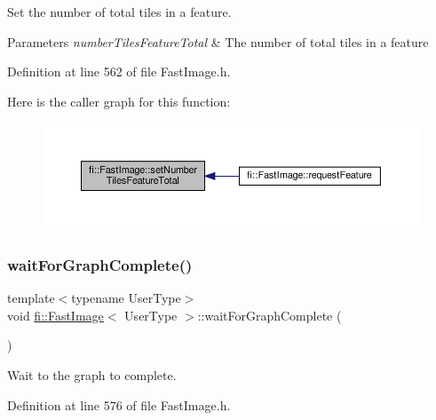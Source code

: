Set the number of total tiles in a feature. 


\begin{DoxyParams}{Parameters}
{\em number\+Tiles\+Feature\+Total} & The number of total tiles in a feature \\
\hline
\end{DoxyParams}


Definition at line 562 of file Fast\+Image.\+h.

Here is the caller graph for this function\+:
\nopagebreak
\begin{figure}[H]
\begin{center}
\leavevmode
\includegraphics[width=350pt]{dc/d6b/classfi_1_1FastImage_a7313f9c3bddf643dfab8cf026527651a_icgraph}
\end{center}
\end{figure}
\mbox{\label{classfi_1_1FastImage_aac69be21b7a131eade5b1ea79dbee59d}} 
\subsubsection{\texorpdfstring{wait\+For\+Graph\+Complete()}{waitForGraphComplete()}}
{\footnotesize\ttfamily template$<$typename User\+Type$>$ \\
void \hyperlink{classfi_1_1FastImage}{fi\+::\+Fast\+Image}$<$ User\+Type $>$\+::wait\+For\+Graph\+Complete (\begin{DoxyParamCaption}{ }\end{DoxyParamCaption})\hspace{0.3cm}{\ttfamily [inline]}}



Wait to the graph to complete. 



Definition at line 576 of file Fast\+Image.\+h.

